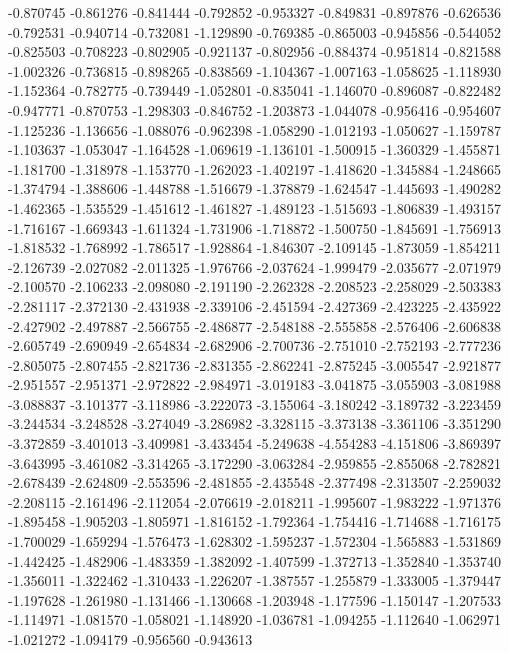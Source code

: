 -0.870745
-0.861276
-0.841444
-0.792852
-0.953327
-0.849831
-0.897876
-0.626536
-0.792531
-0.940714
-0.732081
-1.129890
-0.769385
-0.865003
-0.945856
-0.544052
-0.825503
-0.708223
-0.802905
-0.921137
-0.802956
-0.884374
-0.951814
-0.821588
-1.002326
-0.736815
-0.898265
-0.838569
-1.104367
-1.007163
-1.058625
-1.118930
-1.152364
-0.782775
-0.739449
-1.052801
-0.835041
-1.146070
-0.896087
-0.822482
-0.947771
-0.870753
-1.298303
-0.846752
-1.203873
-1.044078
-0.956416
-0.954607
-1.125236
-1.136656
-1.088076
-0.962398
-1.058290
-1.012193
-1.050627
-1.159787
-1.103637
-1.053047
-1.164528
-1.069619
-1.136101
-1.500915
-1.360329
-1.455871
-1.181700
-1.318978
-1.153770
-1.262023
-1.402197
-1.418620
-1.345884
-1.248665
-1.374794
-1.388606
-1.448788
-1.516679
-1.378879
-1.624547
-1.445693
-1.490282
-1.462365
-1.535529
-1.451612
-1.461827
-1.489123
-1.515693
-1.806839
-1.493157
-1.716167
-1.669343
-1.611324
-1.731906
-1.718872
-1.500750
-1.845691
-1.756913
-1.818532
-1.768992
-1.786517
-1.928864
-1.846307
-2.109145
-1.873059
-1.854211
-2.126739
-2.027082
-2.011325
-1.976766
-2.037624
-1.999479
-2.035677
-2.071979
-2.100570
-2.106233
-2.098080
-2.191190
-2.262328
-2.208523
-2.258029
-2.503383
-2.281117
-2.372130
-2.431938
-2.339106
-2.451594
-2.427369
-2.423225
-2.435922
-2.427902
-2.497887
-2.566755
-2.486877
-2.548188
-2.555858
-2.576406
-2.606838
-2.605749
-2.690949
-2.654834
-2.682906
-2.700736
-2.751010
-2.752193
-2.777236
-2.805075
-2.807455
-2.821736
-2.831355
-2.862241
-2.875245
-3.005547
-2.921877
-2.951557
-2.951371
-2.972822
-2.984971
-3.019183
-3.041875
-3.055903
-3.081988
-3.088837
-3.101377
-3.118986
-3.222073
-3.155064
-3.180242
-3.189732
-3.223459
-3.244534
-3.248528
-3.274049
-3.286982
-3.328115
-3.373138
-3.361106
-3.351290
-3.372859
-3.401013
-3.409981
-3.433454
-5.249638
-4.554283
-4.151806
-3.869397
-3.643995
-3.461082
-3.314265
-3.172290
-3.063284
-2.959855
-2.855068
-2.782821
-2.678439
-2.624809
-2.553596
-2.481855
-2.435548
-2.377498
-2.313507
-2.259032
-2.208115
-2.161496
-2.112054
-2.076619
-2.018211
-1.995607
-1.983222
-1.971376
-1.895458
-1.905203
-1.805971
-1.816152
-1.792364
-1.754416
-1.714688
-1.716175
-1.700029
-1.659294
-1.576473
-1.628302
-1.595237
-1.572304
-1.565883
-1.531869
-1.442425
-1.482906
-1.483359
-1.382092
-1.407599
-1.372713
-1.352840
-1.353740
-1.356011
-1.322462
-1.310433
-1.226207
-1.387557
-1.255879
-1.333005
-1.379447
-1.197628
-1.261980
-1.131466
-1.130668
-1.203948
-1.177596
-1.150147
-1.207533
-1.114971
-1.081570
-1.058021
-1.148920
-1.036781
-1.094255
-1.112640
-1.062971
-1.021272
-1.094179
-0.956560
-0.943613
